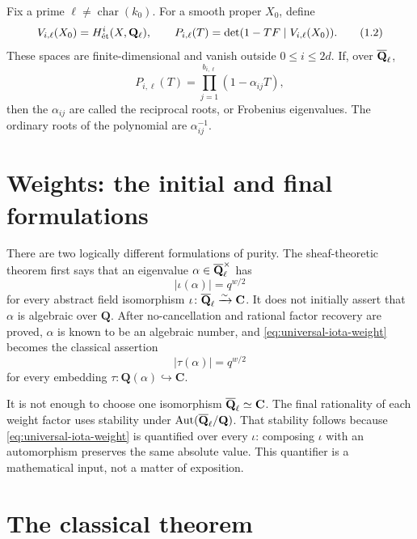 Fix a prime \(\ell\neq\operatorname{char}(k_0)\).  For a smooth proper
\(X_0\), define
\[
 V_{i,\ell}(X_0)=H^i_{\mathrm{\acute et}}(X,\mathbf Q_\ell),\qquad
 P_{i,\ell}(T)=\det(1-TF\mid V_{i,\ell}(X_0)).
 \tag{1.2}\label{eq:def-Pi}
\]
These spaces are finite-dimensional and vanish outside
\(0\leq i\leq2d\).  If, over \(\overline{\mathbf Q}_\ell\),
\[
 P_{i,\ell}(T)=\prod_{j=1}^{b_{i,\ell}}
       (1-\alpha_{ij}T),
\]
then the \(\alpha_{ij}\) are called the reciprocal roots, or Frobenius
eigenvalues.  The ordinary roots of the polynomial are
\(\alpha_{ij}^{-1}\).

\section{Weights: the initial and final formulations}

There are two logically different formulations of purity.  The
sheaf-theoretic theorem first says that an eigenvalue
\(\alpha\in\overline{\mathbf Q}_\ell^\times\) has
\[
 |\iota(\alpha)|=q^{w/2}
 \tag{1.3}\label{eq:universal-iota-weight}
\]
for every abstract field isomorphism
\(\iota\colon\overline{\mathbf Q}_\ell\xrightarrow{\sim}\mathbf C\).  It does not initially
assert that \(\alpha\) is algebraic over \(\mathbf Q\).  After
no-cancellation and rational factor recovery are proved, \(\alpha\) is
known to be an algebraic number, and \eqref{eq:universal-iota-weight}
becomes the classical assertion
\[
 |\tau(\alpha)|=q^{w/2}
\]
for every embedding
\(\tau\colon\mathbf Q(\alpha)\hookrightarrow\mathbf C\).

\begin{warning}
It is not enough to choose one isomorphism
\(\overline{\mathbf Q}_\ell\simeq\mathbf C\).  The final rationality of each weight factor
uses stability under \(\operatorname{Aut}(\overline{\mathbf Q}_\ell/\mathbf Q)\).  That
stability follows because \eqref{eq:universal-iota-weight} is quantified
over every \(\iota\): composing \(\iota\) with an automorphism preserves
the same absolute value.  This quantifier is a mathematical input, not a
matter of exposition.
\end{warning}

\section{The classical theorem}

